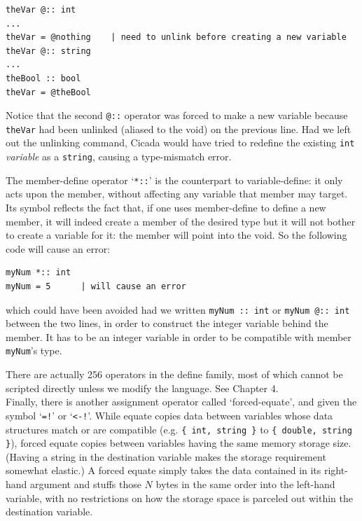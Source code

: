 \documentclass{article}
\newenvironment{code}{
       \begin{list}{}{
               \setlength{\leftmargin}{.4in}
               \setlength{\rightmargin}{0in}
               \setlength{\topsep}{.2in}
       }
       \small
       \item[] }
       { \end{list}   }
\begin{document}
\begin{code} \begin{verbatim}
theVar @:: int
...
theVar = @nothing    | need to unlink before creating a new variable
theVar @:: string
...
theBool :: bool
theVar = @theBool
\end{verbatim} \end{code}

\noindent Notice that the second \verb#@::# operator was forced to make a new variable because \verb#theVar# had been unlinked (aliased to the void) on the previous line.  Had we left out the unlinking command, Cicada would have tried to redefine the existing \verb#int# \emph{variable} as a \verb#string#, causing a type-mismatch error.

The member-define operator `\texttt{*::}' is the counterpart to variable-define:  it only acts upon the member, without affecting any variable that member may target.  Its symbol reflects the fact that, if one uses member-define to define a new member, it will indeed create a member of the desired type but it will not bother to create a variable for it:  the member will point into the void.  So the following code will cause an error:

\begin{code} \begin{verbatim}
myNum *:: int
myNum = 5      | will cause an error
\end{verbatim} \end{code}

\noindent which could have been avoided had we written \verb#myNum :: int# or \verb#myNum @:: int# between the two lines, in order to construct the integer variable behind the member.  It has to be an integer variable in order to be compatible with member \verb#myNum#'s type.

There are actually 256 operators in the define family, most of which cannot be scripted directly unless we modify the language.  See Chapter 4.\\

Finally, there is another assignment operator called `forced-equate', and given the symbol `\texttt{=!}' or `\verb#<-!#'.  While equate copies data between variables whose data structures match or are compatible (e.g. \verb#{ int, string }# to \verb#{ double, string }#), forced equate copies between variables having the same memory storage size.  (Having a string in the destination variable makes the storage requirement somewhat elastic.)  A forced equate simply takes the data contained in its right-hand argument and stuffs those $N$ bytes in the same order into the left-hand variable, with no restrictions on how the storage space is parceled out within the destination variable.
\end{document}
